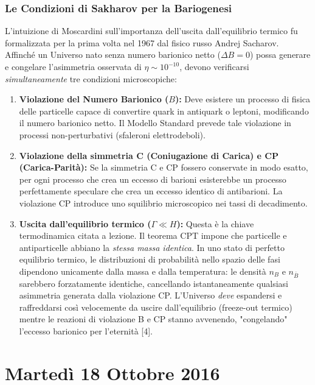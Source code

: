 \documentclass[11pt,a4paper]{report}
\begin{document}
\subsection{Le Condizioni di Sakharov per la Bariogenesi}
L'intuizione di Moscardini sull'importanza dell'uscita dall'equilibrio termico fu formalizzata per la prima volta nel 1967 dal fisico russo Andrej Sacharov. Affinché un Universo nato senza numero barionico netto ($\Delta B = 0$) possa generare e congelare l'asimmetria osservata di $\eta \sim 10^{-10}$, devono verificarsi \textit{simultaneamente} tre condizioni microscopiche:
\begin{enumerate}
    \item \textbf{Violazione del Numero Barionico ($B$):} Deve esistere un processo di fisica delle particelle capace di convertire quark in antiquark o leptoni, modificando il numero barionico netto. Il Modello Standard prevede tale violazione in processi non-perturbativi (sfaleroni elettrodeboli).
    \item \textbf{Violazione della simmetria C (Coniugazione di Carica) e CP (Carica-Parità):} Se la simmetria C e CP fossero conservate in modo esatto, per ogni processo che crea un eccesso di barioni esisterebbe un processo perfettamente speculare che crea un eccesso identico di antibarioni. La violazione CP introduce uno squilibrio microscopico nei tassi di decadimento.
    \item \textbf{Uscita dall'equilibrio termico ($\Gamma \ll H$):} Questa è la chiave termodinamica citata a lezione. Il teorema CPT impone che particelle e antiparticelle abbiano la \textit{stessa massa identica}. In uno stato di perfetto equilibrio termico, le distribuzioni di probabilità nello spazio delle fasi dipendono unicamente dalla massa e dalla temperatura: le densità $n_B$ e $n_{\bar{B}}$ sarebbero forzatamente identiche, cancellando istantaneamente qualsiasi asimmetria generata dalla violazione CP. L'Universo \textit{deve} espandersi e raffreddarsi così velocemente da uscire dall'equilibrio (freeze-out termico) mentre le reazioni di violazione B e CP stanno avvenendo, "congelando" l'eccesso barionico per l'eternità [4].
\end{enumerate}

\chapter{Martedì 18 Ottobre 2016}
\end{document}
